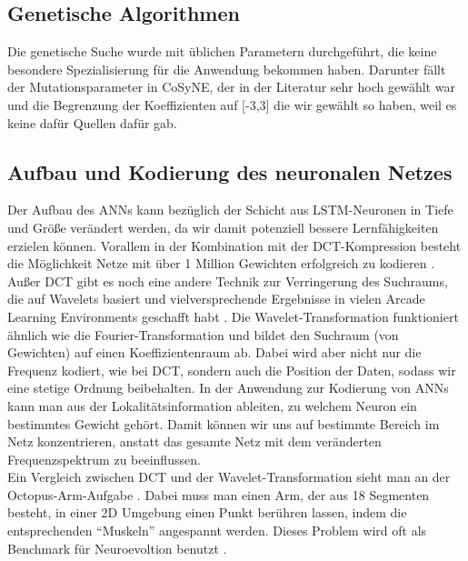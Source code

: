         \subsection*{Genetische Algorithmen}
            Die genetische Suche wurde mit üblichen Parametern durchgeführt, die keine besondere Spezialisierung für die Anwendung bekommen haben. Darunter fällt der Mutationsparameter in CoSyNE, der in der Literatur sehr hoch gewählt war \cite{cosyne2} und die Begrenzung der Koeffizienten auf [-3,3] die wir gewählt so haben, weil es keine dafür Quellen dafür gab. %

        \subsection*{Aufbau und Kodierung des neuronalen Netzes}
            Der Aufbau des ANNs kann bezüglich der Schicht aus LSTM-Neuronen in Tiefe und Größe verändert werden, da wir damit potenziell bessere Lernfähigkeiten erzielen können. Vorallem in der Kombination mit der DCT-Kompression besteht die Möglichkeit Netze mit über 1 Million Gewichten erfolgreich zu kodieren \cite{cosyne4}. \\

            \noindent
            Außer DCT gibt es noch eine andere Technik zur Verringerung des Suchraums, die auf Wavelets basiert und vielversprechende Ergebnisse in vielen Arcade Learning Environments geschafft habt \cite{wavelet}. Die Wavelet-Transformation funktioniert ähnlich wie die Fourier-Transformation und bildet den Suchraum (von Gewichten) auf einen Koeffizientenraum ab. Dabei wird aber nicht nur die Frequenz kodiert, wie bei DCT, sondern auch die Position der Daten, sodass wir eine stetige Ordnung beibehalten. In der Anwendung zur Kodierung von ANNs kann man aus der Lokalitätsinformation ableiten, zu welchem Neuron ein bestimmtes Gewicht gehört. Damit können wir uns auf bestimmte Bereich im Netz konzentrieren, anstatt das gesamte Netz mit dem veränderten Frequenzspektrum zu beeinflussen.\\

            \noindent
            Ein Vergleich zwischen DCT und der Wavelet-Transformation sieht man an der Octopus-Arm-Aufgabe \cite{wavelet}. Dabei muss man einen Arm, der aus 18 Segmenten besteht, in einer 2D Umgebung einen Punkt berühren lassen, indem die entsprechenden ``Muskeln'' angespannt werden. Dieses Problem wird oft als Benchmark für Neuroevoltion benutzt \cite{cosyne1}\cite{cosyne4}\cite{wavelet}.

